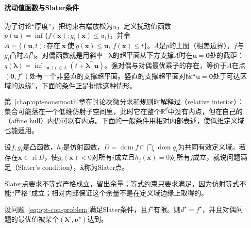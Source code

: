 \paragraph{扰动值函数与Slater条件}
为了讨论“厚度”，把约束右端放松为$u$，定义扰动值函数$p(\bm u)=\inf\{f(\bm x):g_i(\bm x)\leq u_i\}$，并令$A=\{(\bm u,t):\text{存在}\ \bm x\ \text{使}\ g(\bm x)\leq\bm u,\ f(\bm x)\leq t\}$。$A$是$p$的上图（相差边界），$f$与$g_i$凸时$A$凸。对偶函数就是用斜率$-\bm\lambda$的超平面从下方支撑$A$时在$\bm u=\bm0$处的截距：$q(\bm\lambda)=\inf_{(\bm u,t)\in A}(t+\bm\lambda^\top\bm u)$。强对偶与对偶最优乘子的存在，等价于$A$在点$(\bm0,f^\star)$处有一个非竖直的支撑超平面。竖直的支撑超平面对应“$\bm u=\bm0$处于可达区域的边缘”，下面的条件正是排除这种情形。

第~\ref{chap:opt-nonsmooth}章在讨论次微分求和规则时解释过（relative interior）：集合可能落在一个低维仿射子空间里，此时它在整个$\mathbb R^d$中没有内点，但在自己的（affine hull）内仍可以有内点。下面的一般条件用相对内部表述，使低维定义域也能适用。

\begin{definition}[Slater条件]
\label{def:opt-con-slater}
设$f,g_i$是凸函数，$h_j$是仿射函数，$D=\operatorname{dom}f\cap\bigcap_i\operatorname{dom}g_i$为共同有效定义域。若存在$\bar{\bm x}\in\operatorname{ri}D$，使$g_i(\bar{\bm x})<0$对所有$i$成立且$h_j(\bar{\bm x})=0$对所有$j$成立，就说问题满足（Slater's condition），$\bar{\bm x}$称为Slater点。
\end{definition}

Slater点要求不等式严格成立，留出余量；等式约束只要求满足，因为仿射等式不能“严格”成立；相对内部保证这个余量不是在定义域边缘上取得的。

\begin{theorem}[Slater条件下的强对偶]
\label{thm:opt-con-slater}
设问题~\eqref{eq:opt-con-problem}满足Slater条件，且$f^\star$有限。则$d^\star=f^\star$，并且对偶问题的最优值被某个$(\bm\lambda^\star,\bm\nu^\star)$达到。
\end{theorem}

